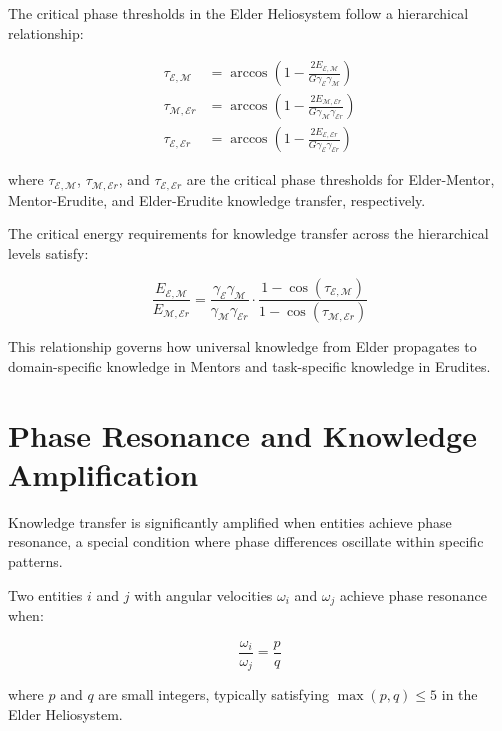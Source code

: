 \begin{theorem}
The critical phase thresholds in the Elder Heliosystem follow a hierarchical relationship:

\begin{align}
\tau_{\mathcal{E},\mathcal{M}} &= \arccos\left(1 - \frac{2E_{\mathcal{E},\mathcal{M}}}{G\gamma_{\mathcal{E}}\gamma_{\mathcal{M}}}\right) \\
\tau_{\mathcal{M},\mathcal{E}r} &= \arccos\left(1 - \frac{2E_{\mathcal{M},\mathcal{E}r}}{G\gamma_{\mathcal{M}}\gamma_{\mathcal{E}r}}\right) \\
\tau_{\mathcal{E},\mathcal{E}r} &= \arccos\left(1 - \frac{2E_{\mathcal{E},\mathcal{E}r}}{G\gamma_{\mathcal{E}}\gamma_{\mathcal{E}r}}\right)
\end{align}

where $\tau_{\mathcal{E},\mathcal{M}}$, $\tau_{\mathcal{M},\mathcal{E}r}$, and $\tau_{\mathcal{E},\mathcal{E}r}$ are the critical phase thresholds for Elder-Mentor, Mentor-Erudite, and Elder-Erudite knowledge transfer, respectively.
\end{theorem}

\begin{theorem}
The critical energy requirements for knowledge transfer across the hierarchical levels satisfy:

\begin{equation}
\frac{E_{\mathcal{E},\mathcal{M}}}{E_{\mathcal{M},\mathcal{E}r}} = \frac{\gamma_{\mathcal{E}}\gamma_{\mathcal{M}}}{\gamma_{\mathcal{M}}\gamma_{\mathcal{E}r}} \cdot \frac{1-\cos(\tau_{\mathcal{E},\mathcal{M}})}{1-\cos(\tau_{\mathcal{M},\mathcal{E}r})}
\end{equation}

This relationship governs how universal knowledge from Elder propagates to domain-specific knowledge in Mentors and task-specific knowledge in Erudites.
\end{theorem}

\section{Phase Resonance and Knowledge Amplification}

Knowledge transfer is significantly amplified when entities achieve phase resonance, a special condition where phase differences oscillate within specific patterns.

\begin{definition}
Two entities $i$ and $j$ with angular velocities $\omega_i$ and $\omega_j$ achieve phase resonance when:

\begin{equation}
\frac{\omega_i}{\omega_j} = \frac{p}{q}
\end{equation}

where $p$ and $q$ are small integers, typically satisfying $\max(p,q) \leq 5$ in the Elder Heliosystem.
\end{definition}

